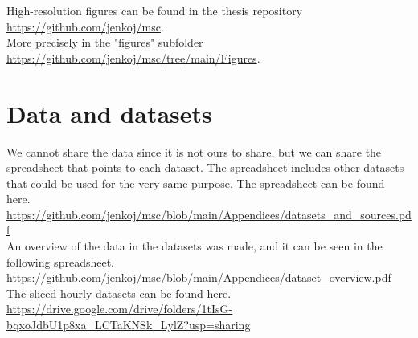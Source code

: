 \noindent High-resolution figures can be found in the thesis repository \url{https://github.com/jenkoj/msc}. \\
\noindent More precisely in the "figures" subfolder \url{https://github.com/jenkoj/msc/tree/main/Figures}. \\

\section{Data and datasets}

\noindent We cannot share the data since it is not ours to share, but we can share the spreadsheet that points to each dataset.
\noindent The spreadsheet includes other datasets that could be used for the very same purpose.
\noindent The spreadsheet can be found here.  \\

\noindent \url{https://github.com/jenkoj/msc/blob/main/Appendices/datasets_and_sources.pdf} \\

\noindent An overview of the data in the datasets was made, and it can be seen in the following spreadsheet.  \\
\noindent \url{https://github.com/jenkoj/msc/blob/main/Appendices/dataset_overview.pdf} \\

\noindent The sliced hourly datasets can be found here. \\
\noindent \url{https://drive.google.com/drive/folders/1tIsG-bqxoJdbU1p8xa_LCTaKNSk_LylZ?usp=sharing} \\












